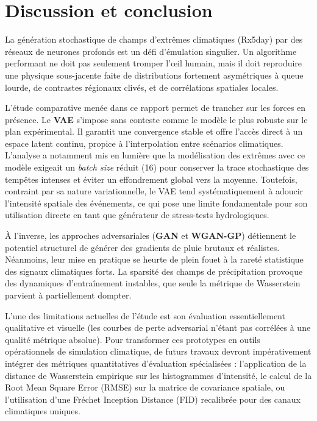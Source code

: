 \documentclass[11pt,a4paper]{article}
\begin{document}
\section{Discussion et conclusion}

La génération stochastique de champs d'extrêmes climatiques (Rx5day) par des réseaux de neurones profonds est un défi d'émulation singulier. Un algorithme performant ne doit pas seulement tromper l'œil humain, mais il doit reproduire une physique sous-jacente faite de distributions fortement asymétriques à queue lourde, de contrastes régionaux clivés, et de corrélations spatiales locales.

L'étude comparative menée dans ce rapport permet de trancher sur les forces en présence. Le \textbf{VAE} s'impose sans conteste comme le modèle le plus robuste sur le plan expérimental. Il garantit une convergence stable et offre l'accès direct à un espace latent continu, propice à l'interpolation entre scénarios climatiques. L'analyse a notamment mis en lumière que la modélisation des extrêmes avec ce modèle exigeait un \textit{batch size} réduit (16) pour conserver la trace stochastique des tempêtes intenses et éviter un effondrement global vers la moyenne. Toutefois, contraint par sa nature variationnelle, le VAE tend systématiquement à adoucir l'intensité spatiale des événements, ce qui pose une limite fondamentale pour son utilisation directe en tant que générateur de stress-tests hydrologiques.

À l'inverse, les approches adversariales (\textbf{GAN} et \textbf{WGAN-GP}) détiennent le potentiel structurel de générer des gradients de pluie brutaux et réalistes. Néanmoins, leur mise en pratique se heurte de plein fouet à la rareté statistique des signaux climatiques forts. La sparsité des champs de précipitation provoque des dynamiques d'entraînement instables, que seule la métrique de Wasserstein parvient à partiellement dompter.

L'une des limitations actuelles de l'étude est son évaluation essentiellement qualitative et visuelle (les courbes de perte adversarial n'étant pas corrélées à une qualité métrique absolue). Pour transformer ces prototypes en outils opérationnels de simulation climatique, de futurs travaux devront impérativement intégrer des métriques quantitatives d'évaluation spécialisées : l'application de la distance de Wasserstein empirique sur les histogrammes d'intensité, le calcul de la Root Mean Square Error (RMSE) sur la matrice de covariance spatiale, ou l'utilisation d'une Fréchet Inception Distance (FID) recalibrée pour des canaux climatiques uniques. 
\end{document}
